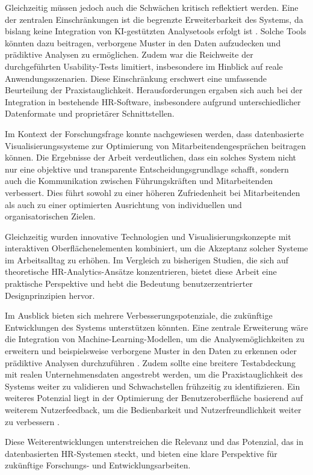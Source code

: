 Gleichzeitig müssen jedoch auch die Schwächen kritisch reflektiert werden. Eine der zentralen Einschränkungen ist die begrenzte Erweiterbarkeit des Systems, da bislang keine Integration von KI-gestützten Analysetools erfolgt ist \cite{tambe2019artificial}. Solche Tools könnten dazu beitragen, verborgene Muster in den Daten aufzudecken und prädiktive Analysen zu ermöglichen. Zudem war die Reichweite der durchgeführten Usability-Tests limitiert, insbesondere im Hinblick auf reale Anwendungsszenarien. Diese Einschränkung erschwert eine umfassende Beurteilung der Praxistauglichkeit. Herausforderungen ergaben sich auch bei der Integration in bestehende HR-Software, insbesondere aufgrund unterschiedlicher Datenformate und proprietärer Schnittstellen. 

Im Kontext der Forschungsfrage konnte nachgewiesen werden, dass datenbasierte Visualisierungssysteme zur Optimierung von Mitarbeitendengesprächen beitragen können. Die Ergebnisse der Arbeit verdeutlichen, dass ein solches System nicht nur eine objektive und transparente Entscheidungsgrundlage schafft, sondern auch die Kommunikation zwischen Führungskräften und Mitarbeitenden verbessert. Dies führt sowohl zu einer höheren Zufriedenheit bei Mitarbeitenden als auch zu einer optimierten Ausrichtung von individuellen und organisatorischen Zielen. 

Gleichzeitig wurden innovative Technologien und Visualisierungskonzepte mit interaktiven Oberflächenelementen kombiniert, um die Akzeptanz solcher Systeme im Arbeitsalltag zu erhöhen. Im Vergleich zu bisherigen Studien, die sich auf theoretische HR-Analytics-Ansätze konzentrieren, bietet diese Arbeit eine praktische Perspektive und hebt die Bedeutung benutzerzentrierter Designprinzipien hervor.

Im Ausblick bieten sich mehrere Verbesserungspotenziale, die zukünftige Entwicklungen des Systems unterstützen könnten. Eine zentrale Erweiterung wäre die Integration von Machine-Learning-Modellen, um die Analysemöglichkeiten zu erweitern und beispielsweise verborgene Muster in den Daten zu erkennen oder prädiktive Analysen durchzuführen \cite{aral2012threeway}. Zudem sollte eine breitere Testabdeckung mit realen Unternehmensdaten angestrebt werden, um die Praxistauglichkeit des Systems weiter zu validieren und Schwachstellen frühzeitig zu identifizieren. Ein weiteres Potenzial liegt in der Optimierung der Benutzeroberfläche basierend auf weiterem Nutzerfeedback, um die Bedienbarkeit und Nutzerfreundlichkeit weiter zu verbessern \cite{sedlmair2011information}. 

Diese Weiterentwicklungen unterstreichen die Relevanz und das Potenzial, das in datenbasierten HR-Systemen steckt, und bieten eine klare Perspektive für zukünftige Forschungs- und Entwicklungsarbeiten.
